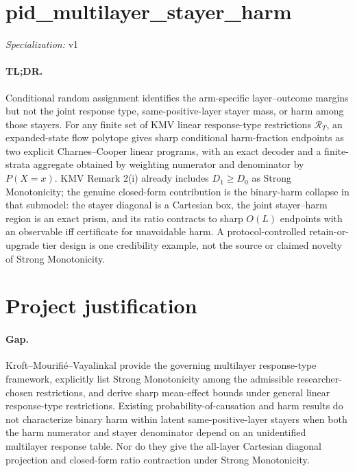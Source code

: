 \documentclass{article}
\begin{document}
\sloppy

\section*{pid\_\allowbreak{}multilayer\_\allowbreak{}stayer\_\allowbreak{}harm}

\noindent\textit{Specialization:} v1\par

\paragraph{TL;DR.} Conditional random assignment identifies the arm-specific layer--outcome margins but not the joint response type, same-positive-layer stayer mass, or harm among those stayers. For any finite set of KMV linear response-type restrictions \(\mathcal R_T\), an expanded-state flow polytope gives sharp conditional harm-fraction endpoints as two explicit Charnes--Cooper linear programs, with an exact decoder and a finite-strata aggregate obtained by weighting numerator and denominator by \(P(X=x)\). KMV Remark 2(i) already includes \(D_1\ge D_0\) as Strong Monotonicity; the genuine closed-form contribution is the binary-harm collapse in that submodel: the stayer diagonal is a Cartesian box, the joint stayer--harm region is an exact prism, and its ratio contracts to sharp \(O(L)\) endpoints with an observable iff certificate for unavoidable harm. A protocol-controlled retain-or-upgrade tier design is one credibility example, not the source or claimed novelty of Strong Monotonicity.

\section{Project justification}

\paragraph{Gap.} Kroft--Mourifi\'e--Vayalinkal provide the governing multilayer response-type framework, explicitly list Strong Monotonicity among the admissible researcher-chosen restrictions, and derive sharp mean-effect bounds under general linear response-type restrictions. Existing probability-of-causation and harm results do not characterize binary harm within latent same-positive-layer stayers when both the harm numerator and stayer denominator depend on an unidentified multilayer response table. Nor do they give the all-layer Cartesian diagonal projection and closed-form ratio contraction under Strong Monotonicity.
\end{document}
